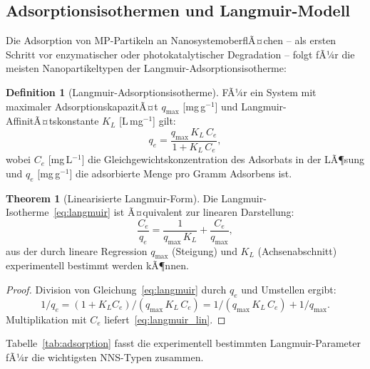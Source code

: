 ﻿\documentclass[12pt,a4paper]{article}
\theoremstyle{definition}
\newtheorem{definition}{Definition}[section]
\newtheorem{theorem}{Theorem}[section]
\theoremstyle{remark}
\begin{document}
\subsection{Adsorptionsisothermen und Langmuir-Modell}

Die Adsorption von MP-Partikeln an NanosystemoberflÃ¤chen -- als ersten Schritt
vor enzymatischer oder photokatalytischer Degradation -- folgt fÃ¼r die meisten
Nanopartikeltypen der Langmuir-Adsorptionsisotherme:

\begin{definition}[Langmuir-Adsorptionsisotherme]
\label{def:langmuir}
FÃ¼r ein System mit maximaler AdsorptionskapazitÃ¤t $q_{\text{max}}$ [mg\,g$^{-1}$]
und Langmuir-AffinitÃ¤tskonstante $K_L$ [L\,mg$^{-1}$] gilt:
\begin{equation}
  q_e = \frac{q_{\text{max}}\,K_L\,C_e}{1 + K_L\,C_e},
  \label{eq:langmuir}
\end{equation}
wobei $C_e$ [mg\,L$^{-1}$] die Gleichgewichtskonzentration des Adsorbats in
der LÃ¶sung und $q_e$ [mg\,g$^{-1}$] die adsorbierte Menge pro Gramm
Adsorbens ist.
\end{definition}

\begin{theorem}[Linearisierte Langmuir-Form]
\label{thm:langmuir_lin}
Die Langmuir-Isotherme~\eqref{eq:langmuir} ist Ã¤quivalent zur linearen Darstellung:
\begin{equation}
  \frac{C_e}{q_e} = \frac{1}{q_{\text{max}}\,K_L} + \frac{C_e}{q_{\text{max}}},
  \label{eq:langmuir_lin}
\end{equation}
aus der durch lineare Regression $q_{\text{max}}$ (Steigung) und
$K_L$ (Achsenabschnitt) experimentell bestimmt werden kÃ¶nnen.
\end{theorem}

\begin{proof}
Division von Gleichung~\eqref{eq:langmuir} durch $q_e$ und Umstellen ergibt:
\begin{equation}
  1/q_e = (1 + K_L C_e)/(q_{\text{max}}\,K_L\,C_e)
= 1/(q_{\text{max}}\,K_L\,C_e) + 1/q_{\text{max}}.
\end{equation}
Multiplikation mit $C_e$ liefert~\eqref{eq:langmuir_lin}.\hfill
\end{proof}

Tabelle~\ref{tab:adsorption} fasst die experimentell bestimmten
Langmuir-Parameter fÃ¼r die wichtigsten NNS-Typen zusammen.
\end{document}
